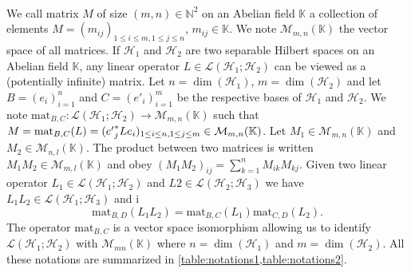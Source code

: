 \paragraph{}
We call matrix $M$ of size $(m,n)\in\mathbb{N}^2$ on an Abelian field
$\mathbb{K}$ a collection of elements $M=(m_{ij})_{1\le i\le m, 1\le j \le n}$,
$m_{ij}\in\mathbb{K}$. We note $\mathcal{M}_{m,n}(\mathbb{K})$ the vector space
of all matrices. If $\mathcal{H}_1$ and $\mathcal{H}_2$ are two separable
Hilbert spaces on an Abelian field $\mathbb{K}$, any linear operator
$L\in\mathcal{L}(\mathcal{H}_1;\mathcal{H}_2)$ can be viewed as a (potentially
infinite) matrix. Let $n=\dim(\mathcal{H}_1)$, $m=\dim(\mathcal{H}_2)$ and let
$B=(e_i)_{i=1}^{n}$ and $C=(e'_i)_{i=1}^{m}$ be the respective bases of
$\mathcal{H}_1$ and $\mathcal{H}_2$. We note $\text{mat}_{B, C}:
\mathcal{L}(\mathcal{H}_1;\mathcal{H}_2) \to \mathcal{M}_{m,n}(\mathbb{K})$
such that $M=\text{mat}_{B, C}(L)=({e'}_j^* L e_i)_{1\le i\le n, 1\le j
\le m}\in\mathcal{M}_{m,n}(\mathbb{K})$. Let
$M_1\in\mathcal{M}_{m,n}(\mathbb{K})$ and
$M_2\in\mathcal{M}_{n,l}(\mathbb{K})$. The product between two matrices is
written $M_1M_2\in\mathcal{M}_{m,l}(\mathbb{K})$ and obey $(M_1M_2)_{ij} =
\sum_{k=1}^n M_{ik}M_{kj}$. Given two linear operator
$L_1\in\mathcal{L}(\mathcal{H}_1;\mathcal{H}_2)$ and
$L2\in\mathcal{L}(\mathcal{H}_2;\mathcal{H}_3)$ we have
$L_1L_2\in\mathcal{L}(\mathcal{H}_1;\mathcal{H}_3)$ and i
\begin{dmath*}
    \text{mat}_{B, D}(L_1L_2)=\text{mat}_{B, C}(L_1)\text{mat}_{C, D}(L_2).
\end{dmath*}
The operator $\text{mat}_{B, C}$ is a vector space isomorphism allowing us to
identify $\mathcal{L}(\mathcal{H}_1;\mathcal{H}_2)$ with
$\mathcal{M}_{mn}(\mathbb{K})$ where $n=\dim(\mathcal{H}_1)$ and
$m=\dim(\mathcal{H}_2)$. All these notations are summarized in
\cref{table:notations1,table:notations2}.
